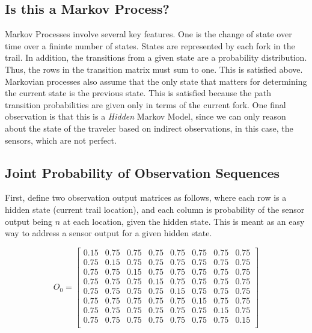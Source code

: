 \documentclass{article}
\begin{document}
\subsection{Is this a Markov Process?}

Markov Processes involve several key features. One is the change of state over 
time over a fininte number of states. States are represented by each fork in the 
trail. In addition, the transitions from a given state are a probability 
distribution. Thus, the rows in the transition matrix must sum to one. This is 
satisfied above. Markovian processes also assume that the only state that 
matters for determining the current state is the previous state. This is 
satisfied because the path transition probabilities are given only in terms of 
the current fork. One final observation is that this is a \textit{Hidden} Markov 
Model, since we can only reason about the state of the traveler based on 
indirect observations, in this case, the sensors, which are not perfect.

\subsection{Joint Probability of Observation Sequences}

First, define two observation output matrices as follows, where each row is a 
hidden state (current trail location), and each column is probability of the 
sensor output being $n$ at each location, given the hidden state. This is meant as 
an easy way to address a sensor output for a given hidden state.

$$
O_0 = \begin{bmatrix}
0.15 & 0.75 & 0.75 & 0.75 & 0.75 & 0.75 & 0.75 & 0.75 \\
0.75 & 0.15 & 0.75 & 0.75 & 0.75 & 0.75 & 0.75 & 0.75 \\
0.75 & 0.75 & 0.15 & 0.75 & 0.75 & 0.75 & 0.75 & 0.75 \\
0.75 & 0.75 & 0.75 & 0.15 & 0.75 & 0.75 & 0.75 & 0.75 \\
0.75 & 0.75 & 0.75 & 0.75 & 0.15 & 0.75 & 0.75 & 0.75 \\
0.75 & 0.75 & 0.75 & 0.75 & 0.75 & 0.15 & 0.75 & 0.75 \\
0.75 & 0.75 & 0.75 & 0.75 & 0.75 & 0.75 & 0.15 & 0.75 \\
0.75 & 0.75 & 0.75 & 0.75 & 0.75 & 0.75 & 0.75 & 0.15 \\
\end{bmatrix}
$$
\end{document}
